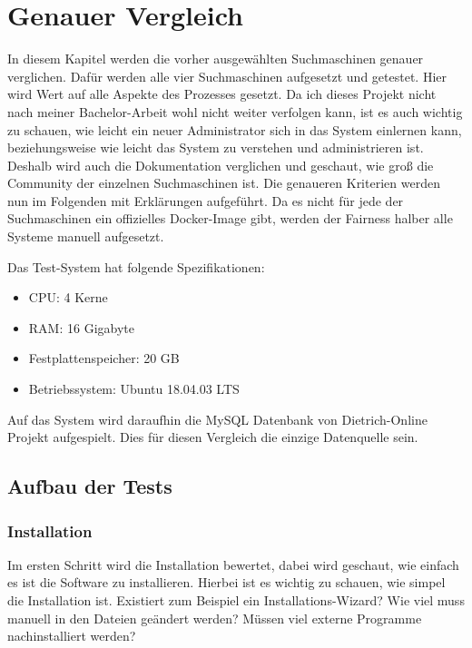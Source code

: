 \chapter{Genauer Vergleich}

In diesem Kapitel werden die vorher ausgewählten Suchmaschinen genauer verglichen. Dafür werden alle vier Suchmaschinen aufgesetzt und getestet. Hier wird Wert auf alle Aspekte des Prozesses gesetzt. Da ich dieses Projekt nicht nach meiner Bachelor-Arbeit wohl nicht weiter verfolgen kann, ist es auch wichtig zu schauen, wie leicht ein neuer Administrator sich in das System einlernen kann, beziehungsweise wie leicht das System zu verstehen und administrieren ist. Deshalb wird auch die Dokumentation verglichen und geschaut, wie groß die Community der einzelnen Suchmaschinen ist. Die genaueren Kriterien werden nun im Folgenden mit Erklärungen aufgeführt. Da es nicht für jede der Suchmaschinen ein offizielles Docker-Image gibt, werden der Fairness halber alle Systeme manuell aufgesetzt.

Das Test-System hat folgende Spezifikationen:

\begin{itemize}
    \item CPU: 4 Kerne
    \item RAM: 16 Gigabyte
    \item Festplattenspeicher: 20 GB
    \item Betriebssystem: Ubuntu 18.04.03 LTS
\end{itemize} 

Auf das System wird daraufhin die MySQL Datenbank von Dietrich-Online Projekt aufgespielt. Dies für diesen Vergleich die einzige Datenquelle sein.

\section{Aufbau der Tests}

\subsection{Installation}

Im ersten Schritt wird die Installation bewertet, dabei wird geschaut, wie einfach es ist die Software zu installieren. Hierbei ist es wichtig zu schauen, wie simpel die Installation ist. Existiert zum Beispiel ein Installations-Wizard? Wie viel muss manuell in den Dateien geändert werden? Müssen viel externe Programme nachinstalliert werden?

